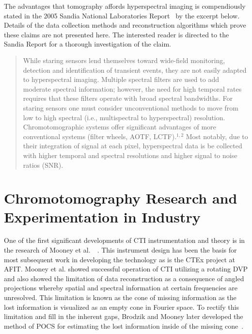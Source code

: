 The advantages that tomography affords hyperspectral imaging is compendiously stated in the 2005 Sandia National Laboratories Report~\cite{Sandia05} by the excerpt below. Details of the data collection methods and reconstruction algorithms which prove these claims are not presented here. The interested reader is directed to the Sandia Report \cite{Sandia05} for a thorough investigation of the claim.

\begin{quote}
While staring sensors lend themselves toward wide-field monitoring, detection and identification of transient events, they are not easily adapted to hyperspectral imaging. Multiple spectral filters are used to add moderate spectral information; however, the need for high temporal rates requires that these filters operate with broad spectral bandwidths. For staring sensors one must consider unconventional methods to move from low to high spectral (i.e., multispectral to hyperspectral) resolution. Chromotomographic systems offer significant advantages of more conventional systems (filter wheels, AOTF, LCTF).$^{1,2}$ Most notably, due to their integration of signal at each pixel, hyperspectral data is be collected with higher temporal and spectral resolutions and higher signal to noise ratios (SNR).
\end{quote}

\section{Chromotomography Research and Experimentation in Industry}
\label{sec:industryResearch}

One of the first significant developments of \ac{CTI} instrumentation and theory is in the research of Mooney et al.~\cite{Mooney95}~\cite{Mooney97}. This instrument design has been the basis for most subsequent work in developing the technology as is the \ac{CTEx} project at \ac{AFIT}. Mooney et al. showed successful operation of \ac{CTI} utilizing a rotating \ac{DVP} and also showed the limitation of data reconstruction as a consequence of angled projections whereby spatial and spectral information at certain frequencies are unresolved. This limitation is known as the cone of missing information as the lost information is visualized as an empty cone in Fourier space. To rectify this limitation and fill in the inherent gaps, Brodzik and Mooney later developed the method of \ac{POCS} for estimating the lost information inside of the missing cone~\cite{Mooney99}.

